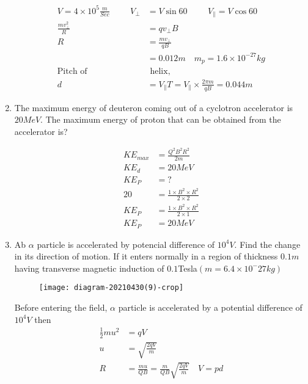 \begin{enumerate}[ label=\color{ocre}\textbf{\arabic*.}]
	\begin{answer}
		\begin{align*}
		V=4\times10^5 \frac{m}{Sec}\hspace{1cm}V_\perp&=V\sin60\hspace{1cm}V_\parallel=V\cos60\\
		\frac{mv_\perp^2}{R}&=qv_\perp B\\
		R&=\frac{m v_\perp}{qB}\\
		&=0.012m \quad m_p=1.6\times 10^{-27}kg\\
		\text{Pitch of}&\text{ helix,}\\
		d&=V_\parallel T=V_\parallel\times\frac{2\pi m}{qB}=0.044m
		\end{align*}
	\end{answer}
	\item The maximum energy of deuteron coming out of a cyclotron accelerator is $20MeV$. The maximum energy of proton that can be obtained from the accelerator is?
	\begin{answer}
		\begin{align*}
		KE_{max}&=\frac{Q^2B^2R^2}{2m}\\
		KE_d&=20 MeV\\
		KE_P&=?\\
		20&=\frac{1\times B^2\times R^2}{2\times2}\\
		KE_P&=\frac{1\times B^2\times R^2}{2\times1}\\
		KE_P&=20MeV
		\end{align*}
	\end{answer}
	\item Ab $\alpha$ particle is accelerated by potencial difference of $10^4V$. Find the change in its direction of motion. If it enters normally in a region of thickness $0.1m$ having transverse magnetic induction of $0.1 $Tesla$(m=6.4\times10^-27kg)$
	\begin{figure}[H]
		\begin{center}
			\texttt{[image: diagram-20210430(9)-crop]}
		\end{center}
	\end{figure}
	\begin{answer}
		Before entering the field, $\alpha$ particle is accelerated by a potential difference of $10^4V$ then\begin{align*}
		\frac{1}{2}mu^2&=qV\\
		u&=\sqrt{\frac{2qV}{m}}\\
		R&=\frac{mu}{QB}=\frac{m}{QB}\sqrt{\frac{2qV}{m}}\quad V=pd\\

\end{align*}
\end{answer}
\end{enumerate}
